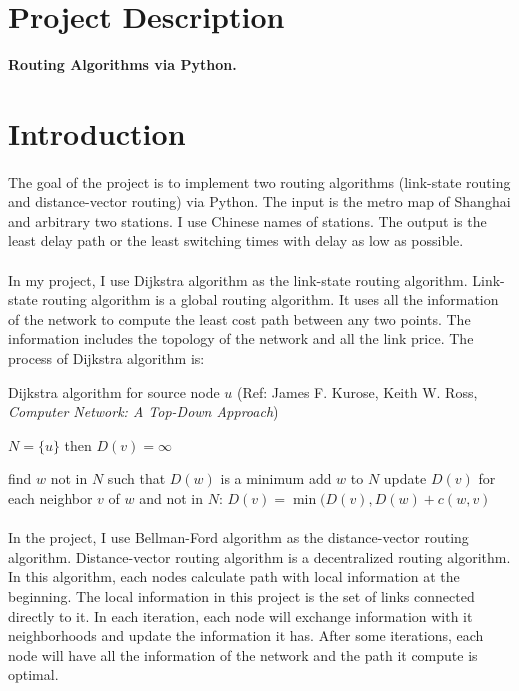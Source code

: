 \documentclass[12pt]{article}
\begin{document}
\section{Project Description}
\textbf{Routing Algorithms via Python.} 

\section{Introduction}
\paragraph{} 
The goal of the project is to implement two routing algorithms (link-state routing and distance-vector routing) via Python. The input is the metro map of  Shanghai and arbitrary two stations. I use Chinese names of stations. The output is the least delay path or the least switching times with delay as low as possible. 

\paragraph{}
In my project, I use Dijkstra algorithm as the link-state routing algorithm. Link-state routing algorithm is a global routing algorithm. It uses all the information of the network to compute the least cost path between any two points. The information includes the topology of the network and all the link price. The process of Dijkstra algorithm is:

\begin{algorithm}
\caption{Dijkstra algorithm for source node $u$ (Ref: James F. Kurose, Keith W. Ross, \textit{Computer Network: A Top-Down Approach})}\label{alg1}
\begin{algorithmic}[1]
\State $N=\{u\}$
\State then $D(v)=\infty$ 
\EndIf 
\EndFor

\State find $w$ not in $N$ such that $D(w)$ is a minimum
\State add $w$ to $N$
\State update $D(v)$ for each neighbor $v$ of $w$ and not in $N$:
\State $D(v)=\min(D(v),D(w)+c(w,v)$
\EndWhile

\end{algorithmic}
\end{algorithm}



\paragraph{}
In the project, I use Bellman-Ford algorithm as the distance-vector routing algorithm. Distance-vector routing algorithm is a decentralized routing algorithm. In this algorithm, each nodes calculate path with local information at the beginning. The local information in this project is the set of links connected directly to it. In each iteration, each node will exchange information with it neighborhoods and update the information it has. After some iterations, each node will have all the information of the network and the path it compute is optimal. 
\end{document}
